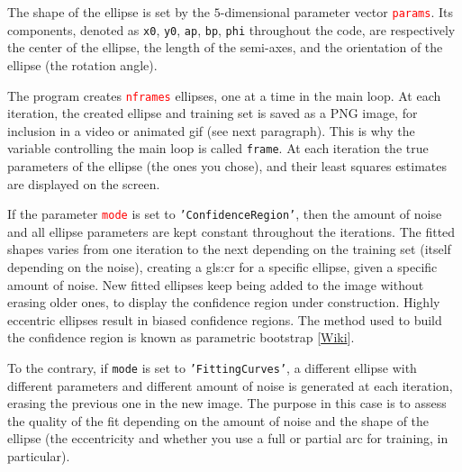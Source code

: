 \documentclass[oneside,10pt]{book}
\begin{document}
The shape of the ellipse is set by the $5$-dimensional parameter vector \textcolor{red}{\texttt{params}}. Its components, denoted
 as \texttt{x0}, \texttt{y0}, \texttt{ap}, \texttt{bp}, \texttt{phi} throughout the code, are respectively the center of the ellipse, the length of the semi-axes, and the orientation of the ellipse (the rotation angle). \vspace{1ex}

 \vspace{1ex}

\noindent The program creates \textcolor{red}{\texttt{nframes}} ellipses, one at a time in the main loop.
 At each iteration, the created ellipse and training set is saved as a PNG image, for inclusion in a video or animated gif (see next paragraph). This is why the variable controlling the main loop is called  \texttt{frame}. At each iteration the true parameters of the ellipse (the ones you chose), and their least squares estimates are displayed on the screen.

If the parameter \textcolor{red}{\texttt{mode}} is set to \texttt{'ConfidenceRegion'}, then the amount of noise and all ellipse parameters are kept constant throughout the iterations. The fitted shapes varies from one iteration to the next depending on the training set (itself depending on the noise), creating a \gls{gls:cr} for a specific ellipse, given a specific amount of noise. New fitted ellipses keep being added to the image without erasing older ones, to display the confidence region under construction. Highly eccentric ellipses result in biased confidence regions.
 The method used to build the confidence region is known as \textcolor{index}{parametric bootstrap} [\href{https://en.wikipedia.org/wiki/Bootstrapping_(statistics)#Parametric_bootstrap}{Wiki}].

To the contrary, if \texttt{mode} is set to \texttt{'FittingCurves'}, a different ellipse with different parameters and different amount of noise is generated at each iteration, erasing the previous one in the new image. The purpose in this case is to assess the quality of the fit depending on the amount of noise and
 the shape of the ellipse (the eccentricity and whether you use a full or partial arc for training, in particular).\vspace{1ex}

 \vspace{1ex}
\end{document}
